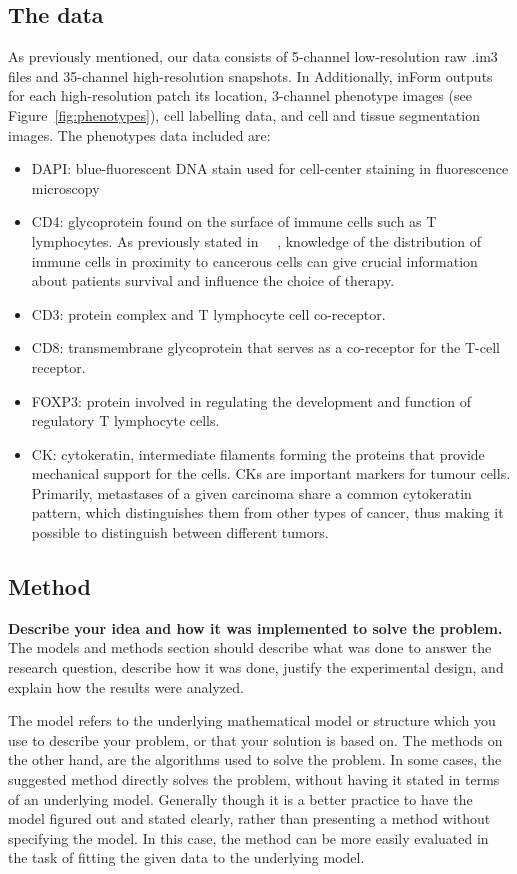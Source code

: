 \documentclass[11pt,conference,compsocconf]{IEEEtran}
\begin{document}
\subsection{The data}\label{subsec:data}
As previously mentioned, our data consists of 5-channel low-resolution raw .im3 files and 35-channel high-resolution snapshots. In Additionally, inForm outputs for each high-resolution patch its location, 3-channel phenotype images (see Figure~\ref{fig:phenotypes}), cell labelling data, and cell and tissue segmentation images. The phenotypes data included are: 
\begin{itemize}
    \item DAPI: blue-fluorescent DNA stain used for cell-center staining in fluorescence microscopy
    \item CD4: glycoprotein found on the surface of immune cells such as T lymphocytes. As previously stated in ~\cite{Carstens2017}~\cite{Bottomley2019}, knowledge of the distribution of immune cells in proximity to cancerous cells can give crucial information about patients survival and influence the choice of therapy.
    \item CD3: protein complex and T lymphocyte cell co-receptor.
    \item CD8: transmembrane glycoprotein that serves as a co-receptor for the T-cell receptor.
    \item FOXP3: protein involved in regulating the development and function of regulatory T lymphocyte cells.
    \item CK: cytokeratin, intermediate filaments forming the proteins that provide mechanical support for the cells. CKs are important markers for tumour cells. Primarily, metastases of a given carcinoma share a common cytokeratin pattern, which distinguishes them from other types of cancer, thus making it possible to distinguish between different tumors.
\end{itemize} 


\subsection{Method}
\textbf{ Describe your idea and how it was implemented to solve
  the problem.}
The models and methods
section should describe what was
done to answer the research question, describe how it was done,
justify the experimental design, and
explain how the results were analyzed.

The model refers to the underlying mathematical model or structure which 
you use to describe your problem, or that your solution is based on. 
The methods on the other hand, are the algorithms used to solve the problem. 
In some cases, the suggested method directly solves the problem, without having it 
stated in terms of an underlying model. Generally though it is a better practice to have 
the model figured out and stated clearly, rather than presenting a method without specifying 
the model. In this case, the method can be more easily evaluated in the task of fitting 
the given data to the underlying model.
\end{document}
